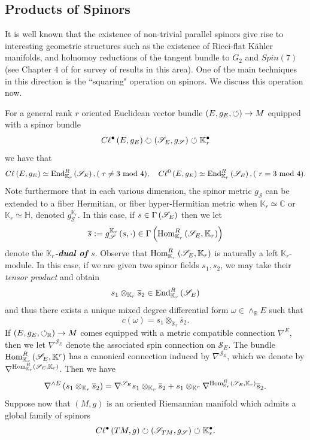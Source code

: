 \documentclass[openany, 11pt]{article}
\theoremstyle{definition}
\theoremstyle{remark}
\def\lp{\ensuremath{\left(}}
\def\rp{\ensuremath{\right)}}
\def\Sc{\ensuremath{\mathscr{S}}}
\def\cal{\ensuremath{\boldsymbol{\circlearrowleft}}}
\def\bC{\ensuremath{\mathbb{C}}}
\def\bH{\ensuremath{\mathbb{H}}}
\def\bR{\ensuremath{\mathbb{R}}}
\def\bK{\ensuremath{\mathbb{K}}}
\def\End{\ensuremath{\textnormal{End}}}
\def\Hom{\ensuremath{\textnormal{Hom}}}
\begin{document}
\subsection{Products of Spinors}
It is well known that the existence of non-trivial parallel spinors give rise to interesting geometric structures such as the existence of Ricci-flat Kähler manifolds, and holnomoy reductions of the tangent bundle to $G_2$ and $Spin(7)$ (see Chapter $4$ of \cite{LM} for survey of results in this area). One of the main techniques in this direction is the ``squaring" operation on spinors. We discuss this operation now.\par
For a general rank $r$ oriented Euclidean vector bundle $\lp E,g_E,\circlearrowleft\rp\rightarrow M$ equipped with a spinor bundle
\[
    C\ell^{\bullet}\lp E,g_E\rp\circlearrowright\lp\Sc_E,g_{\Sc}\rp\circlearrowleft\bK^{\bullet}_r
\]
we have that
\[
    C\ell\lp E,g_E\rp\simeq \End^R_{\bK_r}\lp \Sc_E\rp, (\text{ $r\neq3$ mod 4}),\quad C\ell^0\lp E,g_E\rp\simeq \End^R_{\bK_r}\lp\Sc_E\rp, (\text{ $r=3$ mod 4} ).
\]
Note furthermore that in each various dimension, the spinor metric $g_{\Sc}$ can be extended to a fiber Hermitian, or fiber hyper-Hermitian metric when $\bK_r\simeq\bC$ or $\bK_r\simeq\bH$, denoted $g^{\bK_r}_{\Sc}$. In this case, if $s\in\Gamma\lp\Sc_E\rp$ then we let
\[
    \overline{s}:=g^{\bK_r}_{\Sc}\lp s,\cdot\rp\in\Gamma\lp\Hom^R_{\bK_r}\lp\Sc_E,\bK_r\rp\rp
\]
denote the \textbf{\emph{$\bK_r$-dual of $s$}}. Observe that $\Hom^R_{\bK_r}\lp\Sc_E,\bK_r\rp$ is naturally a left $\bK_r$-module. In this case, if we are given two spinor fields $s_1,s_2$, we may take their \emph{tensor product} and obtain 
\[
    s_1\otimes_{\bK_r}\overline{s}_2\in\End^R_{\bK_r}\lp \Sc_E\rp
\]
and thus there exists a unique mixed degree differential form $\omega\in\wedge_{\bR}E$ such that
\[
    c(\omega)=s_1\otimes_{\bK_r}\overline{s}_2.
\]
If $\lp E,g_E,\cal_{\bR}\rp\rightarrow M$ comes equipped with a metric compatible connection $\nabla^E$, then we let $\nabla^{\Sc_E}$ denote the associated spin connection on $\Sc_E$. The bundle $\Hom^R_{\bK_r}\lp \Sc_E,\bK^r\rp$ has a canonical connection induced by $\nabla^{\Sc_E}$, which we denote by $\nabla^{\Hom^R_{\bK_r}\lp\Sc_E,\bK_r\rp}$. Then we have
\[
    \nabla^{\wedge E}\lp s_1\otimes_{\bK_r}\overline{s}_2\rp=\nabla^{\Sc_E}s_1\otimes_{\bK_r}\overline{s}_2+s_1\otimes_{\bK^r}\nabla^{\Hom^R_{\bK_r}\lp\Sc_E,\bK_r\rp}\overline{s}_2.
\]
Suppose now that $(M,g)$ is an oriented Riemannian manifold which admits a global family of spinors 
\[
    C\ell^{\bullet}\lp TM,g\rp\circlearrowright\lp \Sc_{TM},g_{\Sc}\rp\circlearrowleft\bK^{\bullet}_r.
\]
\end{document}
